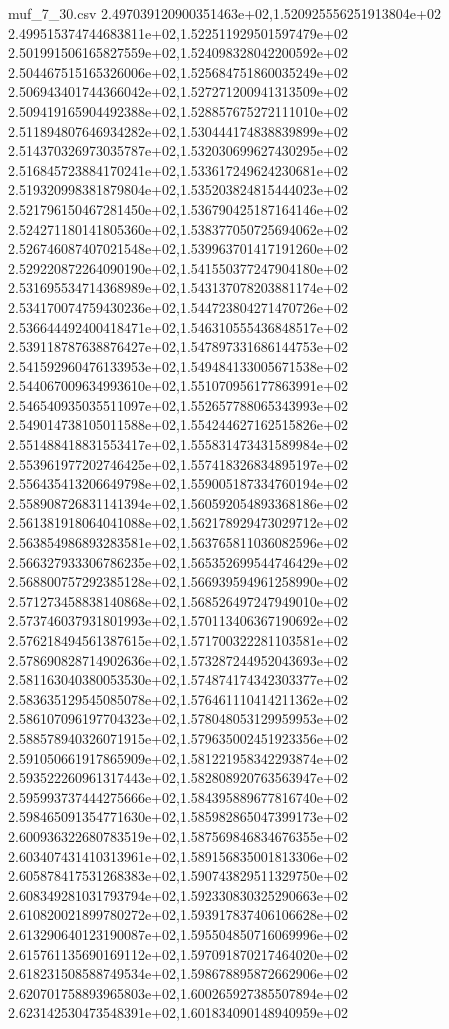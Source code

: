 \begin{filecontents*}{muf_7_30.csv}
2.497039120900351463e+02,1.520925556251913804e+02
2.499515374744683811e+02,1.522511929501597479e+02
2.501991506165827559e+02,1.524098328042200592e+02
2.504467515165326006e+02,1.525684751860035249e+02
2.506943401744366042e+02,1.527271200941313509e+02
2.509419165904492388e+02,1.528857675272111010e+02
2.511894807646934282e+02,1.530444174838839899e+02
2.514370326973035787e+02,1.532030699627430295e+02
2.516845723884170241e+02,1.533617249624230681e+02
2.519320998381879804e+02,1.535203824815444023e+02
2.521796150467281450e+02,1.536790425187164146e+02
2.524271180141805360e+02,1.538377050725694062e+02
2.526746087407021548e+02,1.539963701417191260e+02
2.529220872264090190e+02,1.541550377247904180e+02
2.531695534714368989e+02,1.543137078203881174e+02
2.534170074759430236e+02,1.544723804271470726e+02
2.536644492400418471e+02,1.546310555436848517e+02
2.539118787638876427e+02,1.547897331686144753e+02
2.541592960476133953e+02,1.549484133005671538e+02
2.544067009634993610e+02,1.551070956177863991e+02
2.546540935035511097e+02,1.552657788065343993e+02
2.549014738105011588e+02,1.554244627162515826e+02
2.551488418831553417e+02,1.555831473431589984e+02
2.553961977202746425e+02,1.557418326834895197e+02
2.556435413206649798e+02,1.559005187334760194e+02
2.558908726831141394e+02,1.560592054893368186e+02
2.561381918064041088e+02,1.562178929473029712e+02
2.563854986893283581e+02,1.563765811036082596e+02
2.566327933306786235e+02,1.565352699544746429e+02
2.568800757292385128e+02,1.566939594961258990e+02
2.571273458838140868e+02,1.568526497247949010e+02
2.573746037931801993e+02,1.570113406367190692e+02
2.576218494561387615e+02,1.571700322281103581e+02
2.578690828714902636e+02,1.573287244952043693e+02
2.581163040380053530e+02,1.574874174342303377e+02
2.583635129545085078e+02,1.576461110414211362e+02
2.586107096197704323e+02,1.578048053129959953e+02
2.588578940326071915e+02,1.579635002451923356e+02
2.591050661917865909e+02,1.581221958342293874e+02
2.593522260961317443e+02,1.582808920763563947e+02
2.595993737444275666e+02,1.584395889677816740e+02
2.598465091354771630e+02,1.585982865047399173e+02
2.600936322680783519e+02,1.587569846834676355e+02
2.603407431410313961e+02,1.589156835001813306e+02
2.605878417531268383e+02,1.590743829511329750e+02
2.608349281031793794e+02,1.592330830325290663e+02
2.610820021899780272e+02,1.593917837406106628e+02
2.613290640123190087e+02,1.595504850716069996e+02
2.615761135690169112e+02,1.597091870217464020e+02
2.618231508588749534e+02,1.598678895872662906e+02
2.620701758893965803e+02,1.600265927385507894e+02
2.623142530473548391e+02,1.601834090148940959e+02

\end{filecontents*}
